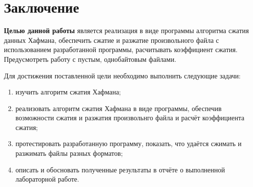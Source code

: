 \chapter*{Заключение}

\textbf{Целью данной работы} является реализация в виде программы алгоритма сжатия данных Хафмана, обеспечить сжатие и разжатие произвольного файла с использованием разработанной программы, расчитывать коэффициент сжатия. Предусмотреть работу с пустым, однобайтовым файлами.

Для достижения поставленной цели необходимо выполнить следующие задачи:
\begin{enumerate}[label=\arabic*)]
	\item изучить алгоритм сжатия Хафмана;
	\item реализовать алгоритм сжатия Хафмана в виде программы, обеспечив возможности сжатия и разжатия произвольнго файла и расчёт коэффициента сжатия;
	\item протестировать разработанную программу, показать, что удаётся сжимать и разжимать файлы разных форматов;
	\item описать и обосновать полученные результаты в отчёте о выполненной лабораторной работе.
\end{enumerate}
